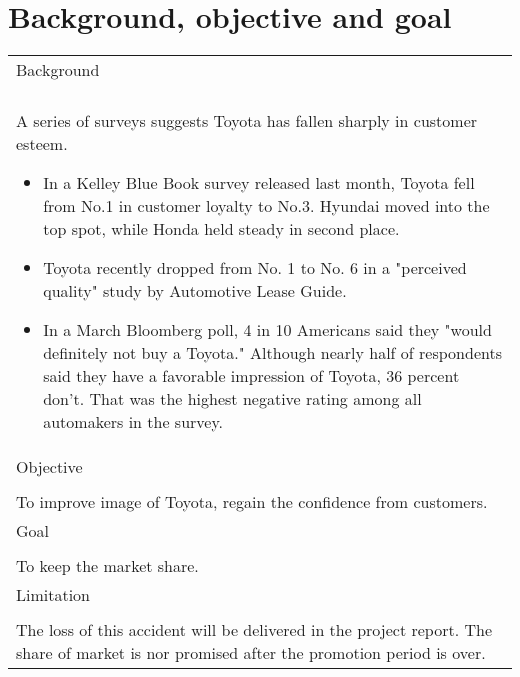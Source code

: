\documentclass{report}
\begin{document}
\chapter{Background, objective and goal}
\begin{table}[h]
\begin{tabular}{| p{12cm} |}

	\hline
	Background \\
	\\
	A series of surveys suggests Toyota has fallen sharply in customer esteem.
	\begin{itemize}
		\item
		In a Kelley Blue Book survey released last month, Toyota fell from No.1 in customer loyalty to No.3. Hyundai moved into the top spot, while 
		Honda held steady in second place.
		\item
		Toyota recently dropped from No. 1 to No. 6 in a "perceived quality" study by Automotive Lease Guide.
		\item
		In a March Bloomberg poll, 4 in 10 Americans said they "would definitely not buy a Toyota." Although nearly half of respondents said they have 
		a favorable impression of Toyota, 36 percent don't. That was the highest negative rating among all automakers in the survey.
		\end{itemize}
		\\

	\hline
		Objective \\
		\\
		To improve image of Toyota, regain the confidence from customers. \\
	
	\hline
		Goal \\
		\\
		To keep the market share. \\

	\hline
		Limitation \\
		\\
		The loss of this accident will be delivered in the project report. The share of market is nor promised after the promotion period is over. \\

	\hline

\end{tabular}
\end{table}
\end{document}
